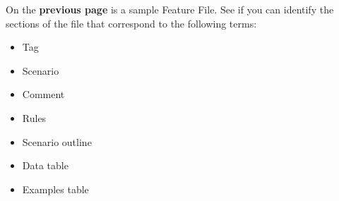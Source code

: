 On the \textbf{previous page} is a sample Feature File. See if you can identify the sections of the file that correspond to the following terms:

\begin{itemize}
    \item Tag
    \item Scenario
    \item Comment
    \item Rules
    \item Scenario outline
    \item Data table
    \item Examples table
\end{itemize}




